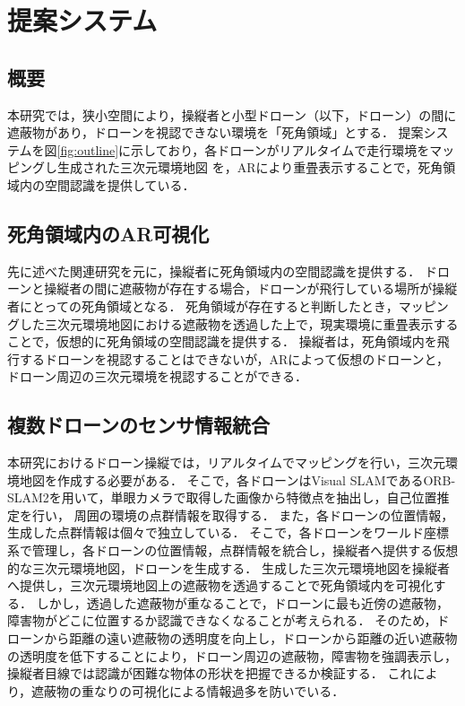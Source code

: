 \documentclass[a4paper,10pt,twocolumn,uplatex]{jsarticle}
\begin{document}
\section{提案システム}
\subsection{概要}
本研究では，狭小空間により，操縦者と小型ドローン（以下，ドローン）の間に遮蔽物があり，ドローンを視認できない環境を「死角領域」とする．
提案システムを図\ref{fig:outline}に示しており，各ドローンがリアルタイムで走行環境をマッピングし生成された三次元環境地図
を，ARにより重畳表示することで，死角領域内の空間認識を提供している．
\par

\subsection{死角領域内のAR可視化}
先に述べた関連研究\cite{Erat}を元に，操縦者に死角領域内の空間認識を提供する．
ドローンと操縦者の間に遮蔽物が存在する場合，ドローンが飛行している場所が操縦者にとっての死角領域となる．
死角領域が存在すると判断したとき，マッピングした三次元環境地図における遮蔽物を透過した上で，現実環境に重畳表示することで，仮想的に死角領域の空間認識を提供する．
操縦者は，死角領域内を飛行するドローンを視認することはできないが，ARによって仮想のドローンと，ドローン周辺の三次元環境を視認することができる．

\subsection{複数ドローンのセンサ情報統合}
本研究におけるドローン操縦では，リアルタイムでマッピングを行い，三次元環境地図を作成する必要がある．
そこで，各ドローンはVisual SLAMであるORB-SLAM2を用いて，単眼カメラで取得した画像から特徴点を抽出し，自己位置推定を行い，
周囲の環境の点群情報を取得する．
また，各ドローンの位置情報，生成した点群情報は個々で独立している．
そこで，各ドローンをワールド座標系で管理し，各ドローンの位置情報，点群情報を統合し，操縦者へ提供する仮想的な三次元環境地図，ドローンを生成する．
生成した三次元環境地図を操縦者へ提供し，三次元環境地図上の遮蔽物を透過することで死角領域内を可視化する．
しかし，透過した遮蔽物が重なることで，ドローンに最も近傍の遮蔽物，障害物がどこに位置するか認識できなくなることが考えられる．
そのため，ドローンから距離の遠い遮蔽物の透明度を向上し，ドローンから距離の近い遮蔽物の透明度を低下することにより，ドローン周辺の遮蔽物，障害物を強調表示し，操縦者目線では認識が困難な物体の形状を把握できるか検証する．
これにより，遮蔽物の重なりの可視化による情報過多を防いでいる．
\end{document}

